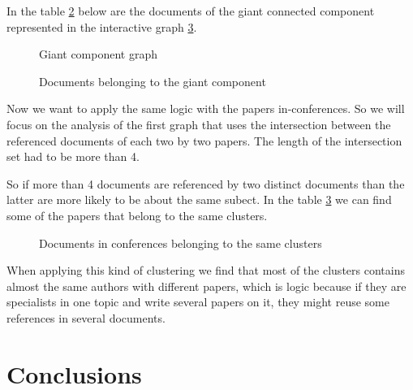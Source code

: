 \documentclass[article,twocolumn]{IEEEtran}
\begin{document}
    In the table \ref{fig10} below are the documents of the giant connected
component represented in the interactive graph \ref{fig11}.


    \begin{figure}
        \begin{center}\end{center}
        \caption{Giant component graph}
        \label{fig12}
    \end{figure}
    

    \begin{figure}
        \begin{center}\end{center}
        \caption{Documents belonging to the giant component}
        \label{fig10}
    \end{figure}
    
    Now we want to apply the same logic with the papers in-conferences. So
we will focus on the analysis of the first graph that uses the
intersection between the referenced documents of each two by two papers.
The length of the intersection set had to be more than 4.

So if more than 4 documents are referenced by two distinct documents
than the latter are more likely to be about the same subect. In the
table \ref{fig11} we can find some of the papers that belong to the same
clusters.


    \begin{figure}
        \begin{center}\end{center}
        \caption{Documents in conferences belonging to the same clusters}
        \label{fig11}
    \end{figure}
    
    When applying this kind of clustering we find that most of the clusters
contains almost the same authors with different papers, which is logic
because if they are specialists in one topic and write several papers on
it, they might reuse some references in several documents.

    \hypertarget{conclusions}{%
\section{Conclusions}\label{conclusions}}
\end{document}
